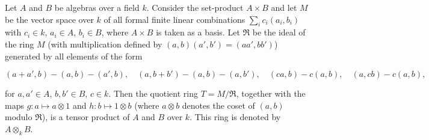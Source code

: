 Let $A$ and $B$ be algebras over a field $k$. Consider the set-product $A \times B$ and let $M$ be the vector space over $k$ of all formal finite linear combinations $\sum_i c_i(a_i, b_i)$ with $c_i \in k$, $a_i \in A$, $b_i \in B$, where $A \times B$ is taken as a basis. Let $\mathfrak{R}$ be the ideal of the ring $M$ (with multiplication defined by $(a,b)(a',b') = (aa', bb')$) generated by all elements of the form

$$(a + a', b) - (a, b) - (a', b), \quad (a, b + b') - (a, b) - (a, b'), \quad (ca, b) - c(a, b), \quad (a, cb) - c(a, b),$$

for $a, a' \in A$, $b, b' \in B$, $c \in k$. Then the quotient ring $T = M/\mathfrak{R}$, together with the maps $g: a \mapsto a \otimes 1$ and $h: b \mapsto 1 \otimes b$ (where $a \otimes b$ denotes the coset of $(a, b)$ modulo $\mathfrak{R}$), is a tensor product of $A$ and $B$ over $k$. This ring is denoted by $A \otimes_k B$.
